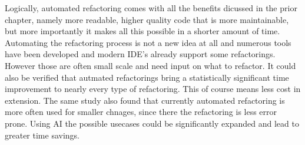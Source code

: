 Logically, automated refactoring comes with all the benefits dicussed in the prior chapter, namely more readable, higher quality code that is more maintainable, but more importantly it makes all this possible in a shorter amount of time. \cite{negara2012using}
Automating the refactoring process is not a new idea at all and numerous tools have been developed and modern IDE's already support some refactorings. However those are often small scale and need input on what to refactor. \cite{usedisuserefactor}
It could also be verified that autmated refactorings bring a statistically significant time improvement to nearly every type of refactoring. \cite{negara2013comparative} This of course means less cost in extension. The same study also found that currently automated refactoring is more often used for smaller chnages, since there the refactoring is less error prone. 
Using AI the possible usecases could be significantly expanded and lead to greater time savings.